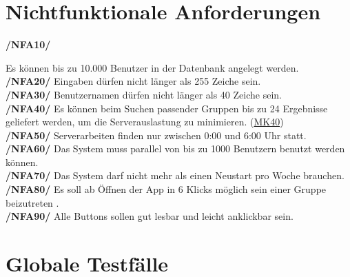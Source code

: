 \documentclass[a4paper]{scrreprt}
\begin{document}
\chapter{Nichtfunktionale Anforderungen}

\begin{addmargin}[25pt]{0pt} 

\hypertarget{nfa10}{\textbf{/NFA10/}} Es können bis zu 10.000 Benutzer in der Datenbank angelegt werden.\\
\hypertarget{nfa20}{\textbf{/NFA20/}} Eingaben dürfen nicht länger als 255 Zeiche sein.\\
\hypertarget{nfa30}{\textbf{/NFA30/}} Benutzernamen dürfen nicht länger als 40 Zeiche sein.\\
\hypertarget{nfa40}{\textbf{/NFA40/}} Es können beim Suchen passender Gruppen bis zu 24 Ergebnisse geliefert werden, um die Serverauslastung zu minimieren. (\hyperlink{m40}{MK40})\\
\hypertarget{nfa50}{\textbf{/NFA50/}} Serverarbeiten finden nur zwischen 0:00 und 6:00 Uhr statt.\\
\hypertarget{nfa60}{\textbf{/NFA60/}} Das System muss parallel von bis zu 1000 Benutzern benutzt werden können.\\
\hypertarget{nfa70}{\textbf{/NFA70/}} Das System darf nicht mehr als einen Neustart pro Woche brauchen.\\
\hypertarget{nfa80}{\textbf{/NFA80/}} Es soll ab Öffnen der App in 6 Klicks möglich sein einer Gruppe beizutreten .\\
\hypertarget{nfa90}{\textbf{/NFA90/}} Alle Buttons sollen gut lesbar und leicht anklickbar sein.\\

\end{addmargin}


\chapter{Globale Testfälle}
\end{document}
